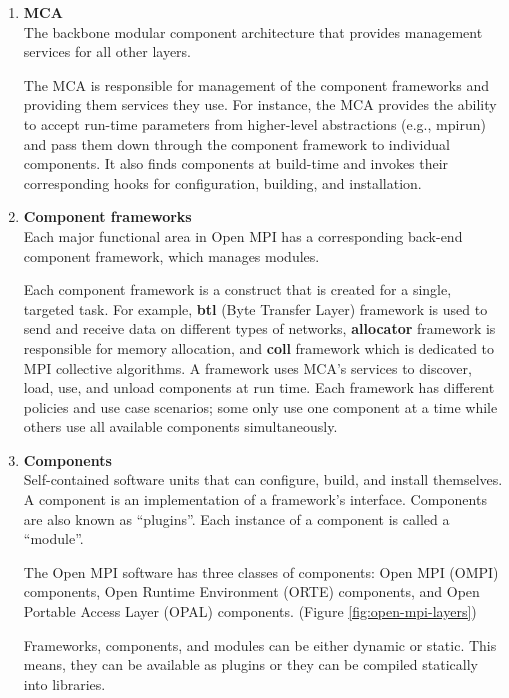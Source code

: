 \begin{enumerate}
\item \textbf {MCA}\\
  The backbone modular component architecture that provides management services for all other layers.
  
  The MCA is responsible for management of the component frameworks and providing them services they use. For instance, the MCA provides the ability to accept run-time parameters from higher-level abstractions (e.g., mpirun) and pass them down through the component framework to individual components. It also finds components at build-time and invokes their corresponding hooks for configuration, building, and installation.
  
\item \textbf{Component frameworks}\\
  Each major functional area in Open MPI has a corresponding back-end component framework, which manages modules.
  
  Each component framework is a construct that is created for a single, targeted task. For example, \textbf{btl} (Byte Transfer Layer) framework is used to send and receive data on different types of networks, \textbf{allocator} framework is responsible for memory allocation, and \textbf{coll} framework which is dedicated to MPI collective algorithms. A framework uses MCA's services to discover, load, use, and unload components at run time. Each framework has different policies and use case scenarios; some only use one component at a time while others use all available components simultaneously.

\item \textbf {Components}\\
  Self-contained software units that can configure, build, and install themselves. A component is an implementation of a framework's interface. Components are also known as ``plugins''. Each instance of a component is called a ``module''. 

  The Open MPI software has three classes of components: Open MPI (OMPI) components, Open Runtime Environment (ORTE) components, and Open Portable Access Layer (OPAL) components. (Figure \ref{fig:open-mpi-layers})

  Frameworks, components, and modules can be either dynamic or static. This means, they can be available as plugins or they can be compiled statically into libraries.
\end{enumerate}

